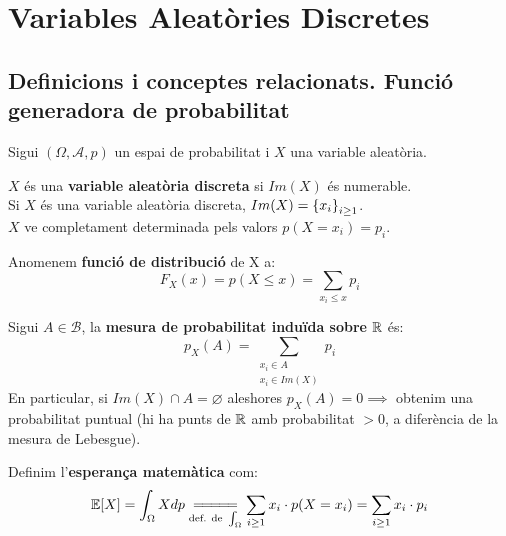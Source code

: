 \section{Variables Aleatòries Discretes}

\subsection{Definicions i conceptes relacionats. Funció generadora de probabilitat}

Sigui $(\Omega, \mathcal{A}, p)$ un espai de probabilitat i $X$ una variable aleatòria.

\begin{defi}
  $X$ és una \textbf{variable aleatòria discreta} si $Im(X)$ és numerable. \\
  Si $X$ és una variable aleatòria discreta, $Im(X) = \left\{x_{i}\right\}_{i \geq 1}$. \\ 
  $X$ ve completament determinada pels valors $p(X=x_{i}) = p_{i}$.
\end{defi}

\begin{defi}
  Anomenem \textbf{funció de distribució} de X a:
  \[
    F_{X}(x)=p(X \leq x) = \sum_{x_{i}\leq x}p_{i}
  \]
\end{defi}

\begin{defi}
  Sigui $A \in \mathcal{B}$, la \textbf{mesura de probabilitat induïda sobre} $\mathbb{R}$ és:
  \[
    p_{X}(A) = \sum_{\substack{x_{i} \in A \\ x_{i}\in Im(X)}}p_{i}
  \]
  En particular, si $Im(X)\cap A = \varnothing$ aleshores $p_{X}(A) = 0 \implies$ obtenim una probabilitat puntual (hi ha punts de $\mathbb{R}$ amb probabilitat $> 0$, a diferència de la mesura de Lebesgue).
\end{defi}

\begin{defi}
  Definim l'\textbf{esperança matemàtica} com: 
  \[
    \E [X] = \int_{\Omega}Xdp \underset{\text{def. de }\int_{\Omega}}{=\joinrel=\joinrel=\joinrel=\joinrel=} \sum_{i\geq 1}x_{i}\cdot p(X=x_{i}) = \sum_{i\geq 1}x_{i}\cdot p_{i}
  \]
\end{defi}
